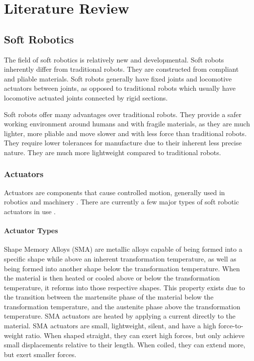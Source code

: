 \chapter{Literature Review}
\label{chp:LR}

\section{Soft Robotics}

The field of soft robotics is relatively new and developmental. Soft robots inherently differ from traditional robots. They are constructed from compliant and pliable materials. Soft robots generally have fixed joints and locomotive actuators between joints, as opposed to traditional robots which usually have locomotive actuated joints connected by rigid sections. \cite{Whitesides2018}

Soft robots offer many advantages over traditional robots. They provide a safer working environment around humans and with fragile materials, as they are much lighter, more pliable and move slower and with less force than traditional robots. They require lower tolerances for manufacture due to their inherent less precise nature. They are much more lightweight compared to traditional robots. \cite{Whitesides2018}

\subsection{Actuators}

Actuators are components that cause controlled motion, generally used in robotics and machinery \cite{Sekhar2012}. There are currently a few major types of soft robotic actuators in use \cite{Boyraz2018}.

\subsubsection{Actuator Types}

Shape Memory Alloys (SMA) are metallic alloys capable of being formed into a specific shape while above an inherent transformation temperature, as well as being formed into another shape below the transformation temperature. When the material is then heated or cooled above or below the transformation temperature, it reforms into those respective shapes. This property exists due to the transition between the martensite phase of the material below the transformation temperature, and the austenite phase above the transformation temperature. SMA actuators are heated by applying a current directly to the material. SMA actuators are small, lightweight, silent, and have a high force-to-weight ratio. When shaped straight, they can exert high forces, but only achieve small displacements relative to their length. When coiled, they can extend more, but exert smaller forces. \cite{Villoslada2015}

